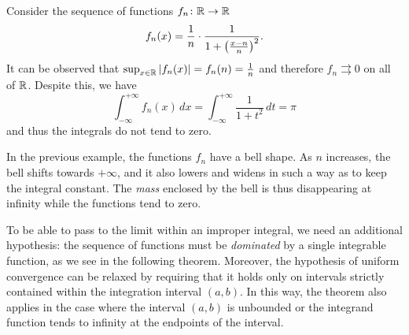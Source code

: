 \begin{example}\label{ex:convergenza_non_dominata}
  Consider the sequence of functions $f_n\colon {\mathbb R}\to{\mathbb R}$
  \[
    f_n(x) = \frac 1 n \cdot \frac{1}{1+{\left( \frac{x-n} n \right)}^2}.
  \]
  It can be observed that $\sup_{x\in {\mathbb R}} {\left|f_n(x)\right|} = f_n(n) = \frac 1 n$ 
  and therefore $f_n \rightrightarrows 0$ on all of ${\mathbb R}$. 
  Despite this, we have 
  \[
  \int_{-\infty}^{+\infty} f_n(x) \, dx  
  = \int_{-\infty}^{+\infty} \frac{1}{1+t^2}\, dt = \pi
  \]
  and thus the integrals do not tend to zero.
\end{example}
%
In the previous example, the functions $f_n$ have a bell shape. As $n$
increases, the bell shifts towards $+\infty$, and it also lowers and widens in
such a way as to keep the integral constant. The \emph{mass} enclosed by the
bell is thus disappearing at infinity while the functions tend to zero.

To be able to pass to the limit within an improper integral, we need an
additional hypothesis: the sequence of functions must be \emph{dominated} by a
single integrable function, as we see in the following theorem. Moreover, the
hypothesis of uniform convergence can be relaxed by requiring that it holds only
on intervals strictly contained within the integration interval $(a,b)$. In this
way, the theorem also applies in the case where the interval $(a,b)$ is
unbounded or the integrand function tends to infinity at the endpoints of the
interval.

